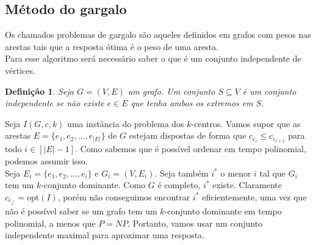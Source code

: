 \documentclass[12pt]{article}
\newcommand{\opt}{\ensuremath{\mathrm{opt}}}
\newtheorem{definition}[theorem]{Definição}
\newcommand{\NP}{\mathit{NP}}
\begin{document}
\subsection{Método do gargalo}
Os chamados problemas de gargalo são aqueles definidos em grafos com pesos nas arestas tais que a resposta ótima é o peso de uma aresta. \\
Para esse algoritmo será necessário saber o que é um conjunto independente de vértices.
\begin{definition}
    Seja $G = (V,E)$ um grafo. Um conjunto $S \subseteq V$ é um conjunto \emph{independente} se não existe $e \in E$ que tenha ambos os extremos em $S$.
\end{definition}
Seja $I(G,c,k)$ uma instância do problema dos $k$-centros. Vamos supor que as arestas $E = \{e_1,e_2,\ldots,e_{|E|}\}$ de $G$ estejam dispostas de forma que $c_{e_i} \leq c_{e_{i+1}}$ para todo $i \in [|E|-1]$. Como sabemos que é possível ordenar em tempo polinomial, podemos assumir isso. \\
Seja $E_i = \{e_1,e_2,\ldots,e_i\}$ e $G_i = (V,E_i)$. Seja também $i^*$ o menor $i$ tal que $G_i$ tem um $k$-conjunto dominante. Como $G$ é completo, $i^*$ existe. Claramente $c_{e_{i^*}} = \opt(I)$, porém não conseguimos encontrar $i^*$ eficientemente, uma vez que não é possível saber se um grafo tem um $k$-conjunto dominante em tempo polinomial, a menos que $P = \NP$. Portanto, vamos usar um conjunto independente maximal para aproximar uma resposta.
\end{document}

